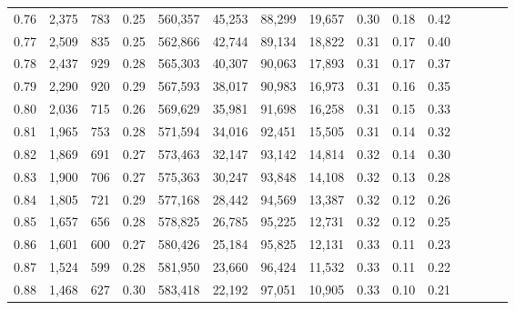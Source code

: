 \begin{tabular}{rrrcrrrrrrrrrrr}
0.76 &   2,375 &    783 &                                       0.25 &  560,357 &   45,253 &   88,299 &   19,657 &  0.30 &  0.18 &                         0.42 \\
0.77 &   2,509 &    835 &                                       0.25 &  562,866 &   42,744 &   89,134 &   18,822 &  0.31 &  0.17 &                         0.40 \\
0.78 &   2,437 &    929 &                                       0.28 &  565,303 &   40,307 &   90,063 &   17,893 &  0.31 &  0.17 &                         0.37 \\
0.79 &   2,290 &    920 &                                       0.29 &  567,593 &   38,017 &   90,983 &   16,973 &  0.31 &  0.16 &                         0.35 \\
0.80 &   2,036 &    715 &                                       0.26 &  569,629 &   35,981 &   91,698 &   16,258 &  0.31 &  0.15 &                         0.33 \\
0.81 &   1,965 &    753 &                                       0.28 &  571,594 &   34,016 &   92,451 &   15,505 &  0.31 &  0.14 &                         0.32 \\
0.82 &   1,869 &    691 &                                       0.27 &  573,463 &   32,147 &   93,142 &   14,814 &  0.32 &  0.14 &                         0.30 \\
0.83 &   1,900 &    706 &                                       0.27 &  575,363 &   30,247 &   93,848 &   14,108 &  0.32 &  0.13 &                         0.28 \\
0.84 &   1,805 &    721 &                                       0.29 &  577,168 &   28,442 &   94,569 &   13,387 &  0.32 &  0.12 &                         0.26 \\
0.85 &   1,657 &    656 &                                       0.28 &  578,825 &   26,785 &   95,225 &   12,731 &  0.32 &  0.12 &                         0.25 \\
0.86 &   1,601 &    600 &                                       0.27 &  580,426 &   25,184 &   95,825 &   12,131 &  0.33 &  0.11 &                         0.23 \\
0.87 &   1,524 &    599 &                                       0.28 &  581,950 &   23,660 &   96,424 &   11,532 &  0.33 &  0.11 &                         0.22 \\
0.88 &   1,468 &    627 &                                       0.30 &  583,418 &   22,192 &   97,051 &   10,905 &  0.33 &  0.10 &                         0.21 \\

\end{tabular}
